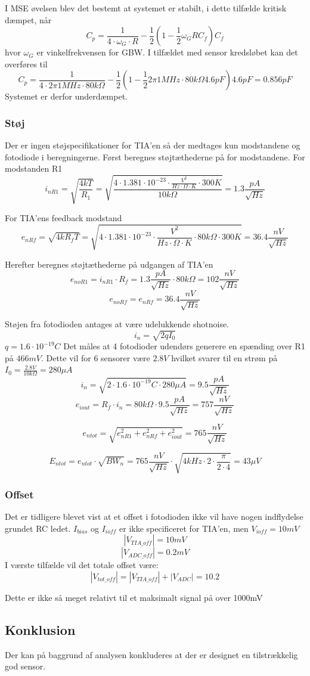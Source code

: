 \documentclass[HardwareDesign/HardwareDesign_main.tex]{subfiles}
\begin{document}
I MSE øvelsen blev det bestemt at systemet er stabilt, i dette tilfælde kritisk dæmpet, når $$C_p=\frac{1}{4\cdot \omega_G \cdot R} - \frac{1}{2}\left( 1 - \frac{1}{2}\omega_G R C_f \right)C_f$$
hvor $\omega_G$ er vinkelfrekvensen for GBW. I tilfældet med sensor kredsløbet kan det overføres til
$$C_p = \frac{1}{4\cdot 2\pi 1\si{MHz} \cdot 80\si{k\Omega}} - \frac{1}{2}\left( 1 - \frac{1}{2} 2\pi 1\si{MHz} \cdot 80\si{k\Omega} 4.6\si{pF} \right)4.6\si{pF} = 0.856\si{pF}$$
Systemet er derfor underdæmpet.

\subsubsection{Støj}
Der er ingen støjspecifikationer for TIA'en så der medtages kun modstandene og fotodiode i beregningerne. 
Først beregnes støjtæthederne på for modstandene.
For modstanden R1
$$i_{nR1} = \sqrt{\frac{4kT}{R_1}} = \sqrt{
\frac{
4\cdot 1.381 \cdot 10^{-23} \cdot \si{
    \frac{V^2}{Hz \cdot \Omega \cdot K}
    }
\cdot 300 \si{K}}{10\si{k\Omega}} } = 1.3 \si{\frac{pA}{\sqrt{Hz}}}$$

For TIA'ens feedback modstand
$$e_{nRf} = \sqrt{4kR_fT} = \sqrt{4\cdot 1.381 \cdot 10^{-23} \cdot  \si{\frac{V^2}{\si{Hz \cdot \Omega \cdot K}}} \cdot 80\si{k\Omega} \cdot 300 \si{K}} = 36.4 \si{\frac{nV}{\sqrt{Hz}}}$$

Herefter beregnes støjtæthederne på udgangen af TIA'en
$$e_{noR1} = i_{nR1} \cdot R_f =1.3 \si{\frac{pA}{\sqrt{Hz}}} \cdot 80\si{k\Omega} = 102 \si{\frac{nV}{\sqrt{Hz}}}$$
$$e_{noRf} = e_{nRf} = 36.4 \si{\frac{nV}{\sqrt{Hz}}}$$

Støjen fra fotodioden antages at være udelukkende shotnoise.
$$i_n = \sqrt{2qI_0}$$
$q = 1.6\cdot 10^{-19} \si{C}$
Det måles at 4 fotodioder udendørs generere en spænding over R1 på $466\si{mV}$. Dette vil for 6 sensorer være $2.8\si{V}$ hvilket svarer til en strøm på $I_0 = \frac{2.8\si{V}}{10\si{k\Omega}} = 280\si{\mu A}$
$$i_n = \sqrt{2 \cdot 1.6\cdot 10^{-19} \si{C} \cdot 280\si{\mu A}} = 9.5 \si{\frac{pA}{\sqrt{Hz}}}$$
$$e_{iout} = R_f \cdot i_n = 80\si{k\Omega} \cdot 9.5 \si{\frac{pA}{\sqrt{Hz}}} = 757 \si{\frac{nV}{\sqrt{Hz}}}$$
 
$$e_{ntot} = \sqrt{e_{nR1}^2 + e_{nRf}^2 + e_{iout}^2} = 765\si{\frac{nV}{\sqrt{Hz}}}$$


$$E_{ntot} = e_{ntot}\cdot \sqrt{BW_n} = 765\si{\frac{nV}{\sqrt{Hz}}}\cdot \sqrt{4\si{kHz}\cdot 2 \cdot \frac{\pi}{2\cdot4}} = 43 \si{\mu V}$$
\subsubsection{Offset}
Det er tidligere blevet vist at et offset i fotodioden ikke vil have nogen indflydelse grundet RC ledet. 
$I_{bias}$ og $I_{ioff}$ er ikke specificeret for TIA'en, men $V_{ioff} = 10mV$ 
$$|V_{TIA\_off}|= 10\si{mV}$$
$$|V_{ADC\_off}| = 0.2\si{mV}$$
I værste tilfælde vil det totale offset være:
$$|V_{tot\_off}| = |V_{TIA\_off}|+|V_{ADC}| = 10.2$$

Dette er ikke så meget relativt til et maksimalt signal på over 1000mV

\subsection{Konklusion}
Der kan på baggrund af analysen konkluderes at der er designet en tilstrækkelig god sensor. 
\end{document}
